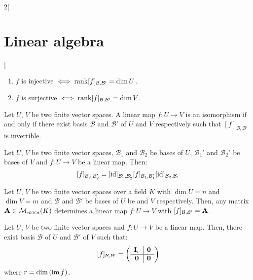\documentclass[../../../main.tex]{subfiles}
\begin{document}
\begin{multicols}{2}[\section{Linear algebra}]
\begin{corollary}
\begin{enumerate}
      \item $f$ is injective $\iff\rank[f]_{\mathcal{B},\mathcal{B}'}=\dim U$.
      \item $f$ is surjective $\iff\rank[f]_{\mathcal{B},\mathcal{B}'}=\dim V$.
    \end{enumerate}
  \end{corollary}
  \begin{corollary}
    Let $U$, $V$ be two finite vector spaces. A linear map $f:U\rightarrow V$ is an isomorphism if and only if there exist basis $\mathcal{B}$ and $\mathcal{B}'$ of $U$ and $V$ respectively such that $[f]_{\mathcal{B},\mathcal{B}'}$ is invertible.
  \end{corollary}
  \begin{proposition}
    Let $U$, $V$ be two finite vector spaces, $\mathcal{B}_1$ and $\mathcal{B}_2$ be bases of $U$, $\mathcal{B}_1'$ and $\mathcal{B}_2'$ be bases of $V$ and $f:U\rightarrow V$ be a linear map. Then: $$[f]_{\mathcal{B}_2,\mathcal{B}_2'}=[\mathrm{id}]_{\mathcal{B}_1',\mathcal{B}_2'}[f]_{\mathcal{B}_1,\mathcal{B}_1'}[\mathrm{id}]_{\mathcal{B}_2,\mathcal{B}_1}$$
  \end{proposition}
  \begin{lemma}
    Let $U$, $V$ be two finite vector spaces over a field $K$ with $\dim U=n$ and $\dim V=m$ and $\mathcal{B}$ and $\mathcal{B}'$ be bases of $U$ be and $V$ respectively. Then, any matrix $\boldsymbol{\mathrm{A}}\in\mathcal{M}_{m\times n}(K)$ determines a linear map $f:U\rightarrow V$ with $[f]_{\mathcal{B},\mathcal{B}'}=\boldsymbol{\mathrm{A}}$.
  \end{lemma}
  \begin{theorem}
    Let $U$, $V$ be two finite vector spaces and $f:U\rightarrow V$ be a linear map. Then, there exist basis $\mathcal{B}$ of $U$ and $\mathcal{B}'$ of $V$ such that:
    $$[f]_{\mathcal{B},\mathcal{B}'}=\left(
      \begin{array}{c|c}
          \boldsymbol{\mathrm{I}}_r & \boldsymbol{\mathrm{0}} \\
          \hline
          \boldsymbol{\mathrm{0}}   & \boldsymbol{\mathrm{0}}
        \end{array}\right)$$
    where $r=\dim\left(\operatorname{im} f\right)$.
  \end{theorem}

\end{multicols}
\end{document}
